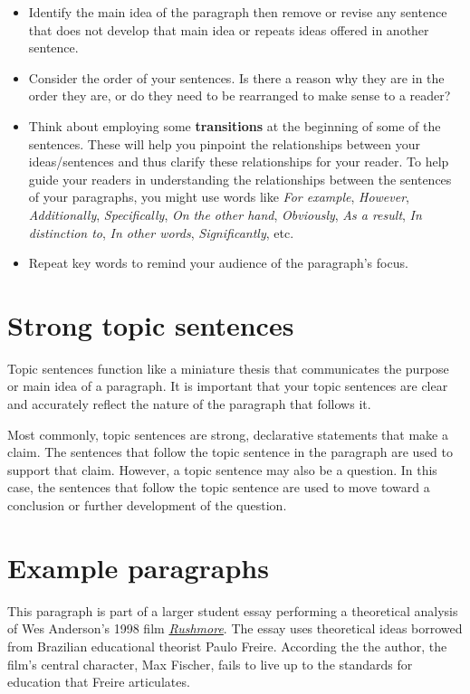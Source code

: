 \begin{itemize}

\item Identify the main idea of the paragraph then remove or revise any sentence that does not 
develop that main idea or repeats ideas offered in another sentence.

\item Consider the order of your sentences. Is there a reason why they are in the order 
they are, or do they need to be rearranged to make sense to a reader?

\item Think about employing some \textbf{transitions} at the beginning 
of some of the sentences. These will help you pinpoint the relationships between your 
ideas/sentences and thus clarify these relationships for your reader. To help guide your readers in understanding the relationships between the sentences of your paragraphs, you might use words like \emph{For example}, \emph{However}, \emph{Additionally}, \emph{Specifically}, \emph{On the other hand}, \emph{Obviously}, \emph{As a result}, \emph{In distinction to}, \emph{In other words}, \emph{Significantly}, etc.

\item Repeat key words to remind your audience of the paragraph's focus.

\end{itemize}
 
\section{Strong topic sentences}
Topic sentences function like a miniature thesis that communicates the purpose or main idea of a paragraph. It is important that your topic sentences are clear and accurately reflect the nature of the paragraph that follows it. 

Most commonly, topic sentences are strong, declarative statements that make a claim. The sentences that follow the topic sentence in the paragraph are used to support that claim. However, a topic sentence may also be a question. In this case, the sentences that follow the topic sentence are used to move toward a conclusion or further development of the question. 
 
\section{Example paragraphs}

This paragraph is part of a larger student essay performing a theoretical analysis of Wes Anderson's 1998 film \href{http://en.wikipedia.org/wiki/Rushmore_%28film%29}{\emph{Rushmore}}. The essay uses theoretical ideas borrowed from Brazilian educational theorist Paulo Freire. According the the author, the film's central character, Max Fischer, fails to live up to the standards for education that Freire articulates.

